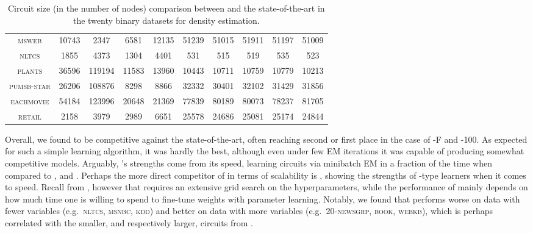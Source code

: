 \begin{table}[t]
{\begin{tabular}{c|cccc|ccccc}
    \textsc{msweb     } & 10743   & 2347    & 6581  & 12135   &  51239 &   51015 &  51911 &  51197 &  51009 \\
    \textsc{nltcs     } & 1855    & 4373    & 1304  & 4401    &    531 &     515 &    519 &    535 &    523 \\
    \textsc{plants    } & 36596   & 119194  & 11583 & 13960   &  10443 &   10711 &  10759 &  10779 &  10213 \\
    \textsc{pumsb-star} & 26206   & 108876  & 8298  & 8866    &  32332 &   30401 &  32102 &  31429 &  31856 \\
    \textsc{eachmovie } & 54184   & 123996  & 20648 & 21369   &  77839 &   80189 &  80073 &  78237 &  81705 \\
    \textsc{retail    } & 2158    & 3979    & 2989  & 6651    &  25578 &   24686 &  25081 &  25174 &  24844 \\
    \hline
  \end{tabular}
  }
  \caption{Circuit size (in the number of nodes) comparison between  and the
    state-of-the-art in the twenty binary datasets for density estimation.}
  \label{tab:binsize}
\end{table}

Overall, we found  to be competitive against the state-of-the-art, often
reaching second or first place in the case of -F and -100. As
expected for such a simple learning algorithm, it was hardly the best, although even under few EM
iterations it was capable of producing somewhat competitive models. Arguably, 's
strengths come from its speed, learning circuits via minibatch EM in a fraction of the time when
compared to ,  and . Perhaps the more
direct competitor of  in terms of scalability is , showing the
strengths of \randclass{}-type learners when it comes to speed. Recall from ,
however that  requires an extensive grid search on the hyperparameters, while the
performance of  mainly depends on how much time one is willing to spend to
fine-tune weights with parameter learning. Notably, we found that  performs worse
on data with fewer variables (e.g.\ \textsc{nltcs}, \textsc{msnbc}, \textsc{kdd}) and better on
data with more variables (e.g.\ \textsc{20-newsgrp}, \textsc{book}, \textsc{webkb}), which is
perhaps correlated with the smaller, and respectively larger, circuits from .

